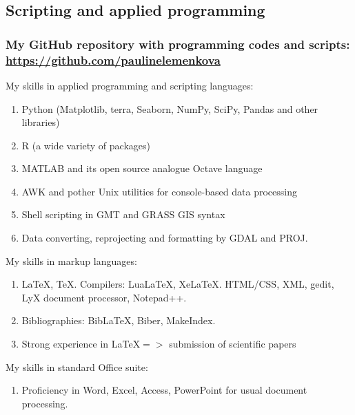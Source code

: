 \documentclass[pdflatex,compress,8pt,
	xcolor={dvipsnames,dvipsnames,svgnames,x11names,table},
	hyperref={colorlinks = true,breaklinks = true, urlcolor = NavyBlue, breaklinks = true}]{beamer}
\begin{document}
\subsection{Scripting and applied programming}
\begin{frame}\frametitle{My GitHub repository with programming codes and scripts: \href{https://github.com/paulinelemenkova}{https://github.com/paulinelemenkova}}

\begin{alertblock}{My skills in applied programming and scripting languages:}
\begin{enumerate}[\ding{51}]
	\item Python (Matplotlib, terra, Seaborn, NumPy, SciPy, Pandas and other libraries)
	\item R (a wide variety of packages)
	\item MATLAB and its open source analogue Octave language
	\item AWK and pother Unix utilities for console-based data processing
	\item Shell scripting in GMT and GRASS GIS syntax
	\item Data converting, reprojecting and formatting by GDAL and PROJ.
\end{enumerate}
\end{alertblock}

\begin{alertblock}{My skills in markup languages:}
\begin{enumerate}[\ding{51}]
	\item \LaTeX , \TeX . Compilers: Lua\LaTeX, Xe\LaTeX . HTML/CSS, XML, gedit, LyX document processor, Notepad++. 
	\item Bibliographies: Bib\LaTeX, Biber, MakeIndex.
	\item Strong experience in \LaTeX $=>$ submission of scientific papers
\end{enumerate}
\end{alertblock}

\begin{alertblock}{My skills in standard Office suite:}
\begin{enumerate}[\ding{51}]
	\item Proficiency in Word, Excel, Access, PowerPoint for usual document processing.
\end{enumerate}
\end{alertblock}
\end{frame}
\end{document}
